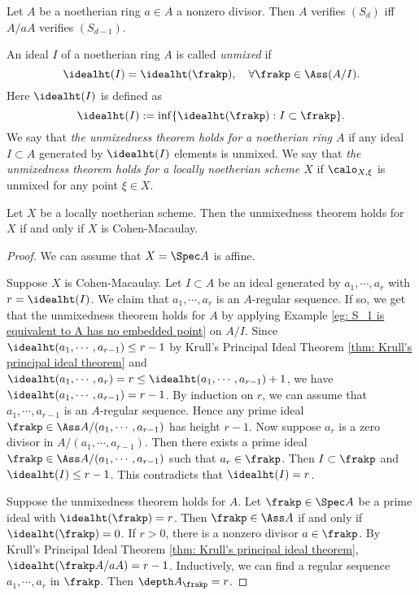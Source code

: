     \begin{corollary}\label{cor: induction on S_d conditions}
        Let $A$ be a noetherian ring $a \in A$ a nonzero divisor.
        Then $A$ verifies $(S_d)$ iff $A/aA$ verifies $(S_{d-1})$.
    \end{corollary}

    \begin{definition}\label{def: unmixedness theorem}
        An ideal $I$ of a noetherian ring $A$ is called \textit{unmixed} if 
        \[ \idealht(I) = \idealht(\frakp), \quad \forall \frakp \in \Ass(A/I). \]
        Here $\idealht(I)$ is defined as 
        \[ \idealht(I) := \inf \{ \idealht(\frakp) : I \subset \frakp \}. \]
        We say that \textit{the unmixedness theorem holds for a noetherian ring $A$} if any ideal $I \subset A$ generated by $\idealht(I)$ elements is unmixed.
        We say that \textit{the unmixedness theorem holds for a locally noetherian scheme $X$} if $\calo_{X,\xi}$ is unmixed for any point $\xi \in X$.
    \end{definition}


    \begin{theorem}\label{thm: unmixedness theorem for Cohen-Macaulay schemes}
        Let $X$ be a locally noetherian scheme.
        Then the unmixedness theorem holds for $X$ if and only if $X$ is Cohen-Macaulay.
    \end{theorem}
    \begin{proof}
        We can assume that $X = \Spec A$ is affine.

        Suppose $X$ is Cohen-Macaulay.
        Let $I \subset A$ be an ideal generated by $a_1,\cdots,a_r$ with $r = \idealht(I)$.
        We claim that $a_1,\cdots,a_r$ is an $A$-regular sequence.
        If so, we get that the unmixedness theorem holds for $A$ by applying Example \ref{eg: S_1 is equivalent to A has no embedded point} on $A/I$. 
        Since $\idealht(a_1,\cdots,a_{r-1}) \leq r-1$ by Krull's Principal Ideal Theorem \ref{thm: Krull's principal ideal theorem} and $\idealht(a_1,\cdots,a_r) = r \leq \idealht(a_1,\cdots,a_{r-1}) + 1$, we have $\idealht(a_1,\cdots,a_{r-1}) = r-1$.
        By induction on $r$, we can assume that $a_1,\cdots,a_{r-1}$ is an $A$-regular sequence.
        Hence any prime ideal $\frakp \in \Ass A/(a_1,\cdots,a_{r-1})$ has height $r-1$.
        Now suppose $a_r$ is a zero divisor in $A/(a_1,\cdots,a_{r-1})$.
        Then there exists a prime ideal $\frakp \in \Ass A/(a_1,\cdots,a_{r-1})$ such that $a_r \in \frakp$.
        Then $I \subset \frakp$ and $\idealht(I) \leq r-1$.
        This contradicts that $\idealht(I) = r$.
        
        Suppose the unmixedness theorem holds for $A$.
        Let $\frakp \in \Spec A$ be a prime ideal with $\idealht(\frakp) = r$.
        Then $\frakp \in \Ass A$ if and only if $\idealht(\frakp) = 0$.
        If $r > 0$, there is a nonzero divisor $a \in \frakp$.
        By Krull's Principal Ideal Theorem \ref{thm: Krull's principal ideal theorem}, $\idealht(\frakp A/aA) = r-1$.
        Inductively, we can find a regular sequence $a_1,\cdots,a_r$ in $\frakp$.
        Then $\depth A_\frakp = r$.
    \end{proof}

